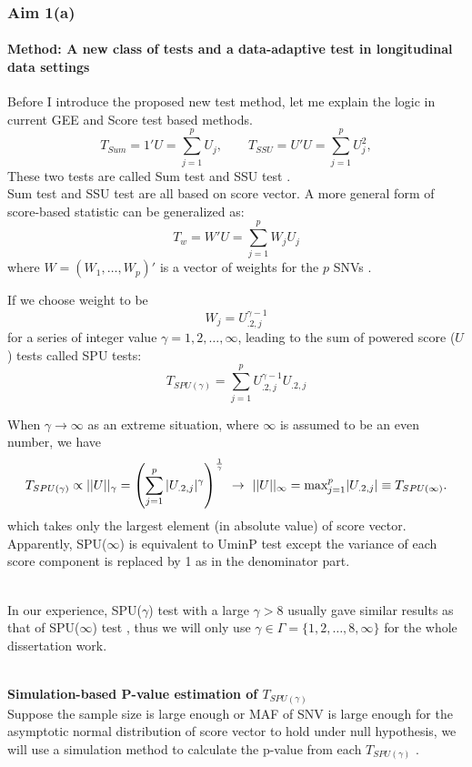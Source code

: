 \documentclass[compress]{beamer}
\begin{document}
\begin{frame}[allowframebreaks]
\frametitle{Aim 1(a)}
\framesubtitle{Method: A new class of tests and a data-adaptive test in longitudinal data settings}
\scriptsize
Before I introduce the proposed new test method, let me explain the logic in current GEE and Score test based methods.
$$
T_{Sum} = 1' U = \sum_{j=1}^p U_j, \qquad T_{SSU} = U'U = \sum_{j=1}^p U_j^2,
$$
These two tests are called Sum test and SSU test \cite{Pan2009}. \\

Sum test and SSU test are all based on score vector. A more general form of score-based statistic can be generalized as:
$$
T_w = W' U = \sum_{j=1}^p W_j U_j
$$
where $W = (W_1, \ldots, W_p)'$ is a vector of weights for the $p$ SNVs \cite{Lin2011}. 

\framebreak
If we choose weight to be
$$W_j = U_{.2, j} ^ { \gamma - 1} $$
for a series of integer value $\gamma = 1,2,\ldots,\infty$, leading to the sum of powered score ($U$) tests called SPU tests:
$$
T_{ SPU ( \gamma ) } = \sum_{j=1}^p U_{.2, j} ^ { \gamma - 1} U_{.2, j}
$$

\pagebreak
When $\gamma \rightarrow \infty$ as an extreme situation, where $\infty$ is assumed to be an even number, we have
$$
T_{ SPU(\gamma) } \propto ||U||_{\gamma} = \left( \sum_{j=1}^p |U_{.2, j}| ^ { \gamma } \right) ^ { 1 \over \gamma } \ \rightarrow \ ||U||_{\infty} = \textrm{max}_{j=1} ^ p |U_{.2, j}| \equiv T_{ SPU(\infty) }.
$$ 
which takes only the largest element (in absolute value) of score vector. Apparently, SPU($\infty$) is equivalent to UminP test except the variance of each score component is replaced by 1 as in the denominator part.\\\

In our experience, SPU($\gamma$) test with a large $\gamma > 8$ usually gave similar results as that of SPU($\infty$) test \cite{pan2014powerful}, thus we will only use $\gamma \in \Gamma = \{1,2,\ldots,8,\infty \} $ for the whole dissertation work. \\\

\framebreak
\textbf{Simulation-based P-value estimation of $T_{ SPU(\gamma) }$ }\\
Suppose the sample size is large enough or MAF of SNV is large enough for the asymptotic normal distribution of score vector to hold under null hypothesis, we will use a simulation method to calculate the p-value from each $T_{ SPU(\gamma) }$ \cite{Lin2005,Seaman2005}. \\\


\end{frame}
\end{document}
